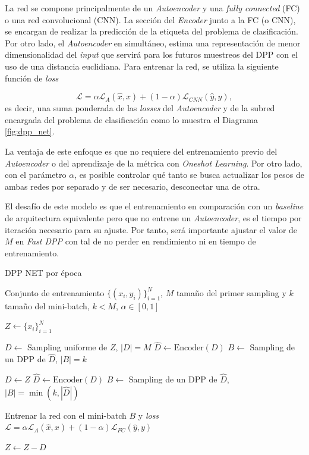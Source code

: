\vspace{0.2cm}

La red se compone principalmente de un \textit{Autoencoder} y una \textit{fully connected} (FC) o una red convolucional (CNN). La sección del \textit{Encoder} junto a la FC (o CNN), se encargan de realizar la predicción de la etiqueta del problema de clasificación. Por otro lado, el \textit{Autoencoder} en simultáneo, estima una representación de menor dimensionalidad del \textit{input} que servirá para los futuros muestreos del DPP con el uso de una distancia euclidiana. Para entrenar la red, se utiliza la siguiente función de \textit{loss}

\[
\mathcal{L} = \alpha\mathcal{L}_A(\hat{x},x) + (1-\alpha)\mathcal{L}_{CNN}(\hat{y},y) , 
\] es decir, una suma ponderada de las \textit{losses} del \textit{Autoencoder} y de la subred encargada del problema de clasificación como lo muestra el Diagrama \ref{fig:dpp_net}.

\vspace{0.2cm}

La ventaja de este enfoque es que no requiere del entrenamiento previo del \textit{Autoencoder} o del aprendizaje de la métrica con \textit{Oneshot Learning}. Por otro lado, con el parámetro $\alpha$, es posible controlar qué tanto se busca actualizar los pesos de ambas redes por separado y de ser necesario, desconectar una de otra. 

\vspace{0.2cm}

El desafío de este modelo es que el entrenamiento en comparación con un \textit{baseline} de arquitectura equivalente pero que no entrene un \textit{Autoencoder}, es el tiempo por iteración necesario para su ajuste. Por tanto, será importante ajustar el valor de $M$ en \textit{Fast DPP} con tal de no perder en rendimiento ni en tiempo de entrenamiento. 

\begin{algorithm}
\caption{DPP NET por época}\label{alg:alg7}
\begin{algorithmic}
\Require Conjunto de entrenamiento $\{(x_i,y_i) \}_{i=1}^N$, $M$ tamaño del primer sampling y $k$ tamaño del mini-batch, $k < M$, $\alpha \in [0,1]$ 

\State $Z \gets \{x_i\}_{i=1}^N$


\State $D \gets$ Sampling uniforme de $Z$, $|D| = M$
\State $\hat{D} \gets \text{Encoder}(D)$
\State $B \gets$ Sampling de un DPP de $\hat{D}$, $|B| = k$  

\Else

\State $D \gets Z$
\State $\hat{D} \gets \text{Encoder}(D)$
\State $B \gets$ Sampling de un DPP de $\hat{D}$, $|B| = \min(k, |\hat{D}|)$ 

\EndIf

\State Entrenar la red con el mini-batch $B$ y \textit{loss} $\mathcal{L} = \alpha\mathcal{L}_A(\hat{x},x) + (1-\alpha)\mathcal{L}_{FC}(\hat{y},y) $ 

\State $Z \gets Z - D$

\EndWhile  
\end{algorithmic}
\end{algorithm}

